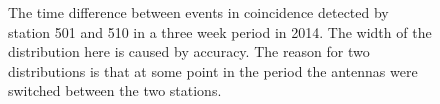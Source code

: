 \begin{figure}
    \centering
    
    \caption{ The
             time difference between events in coincidence detected by
             station 501 and 510 in a three week period in 2014. The
             width of the distribution here is caused by \gps accuracy.
             The reason for two distributions is that at some point in
             the period the \gps antennas were switched between the two
             stations.}
    \label{fig:station_offsets_501_510}
\end{figure}


